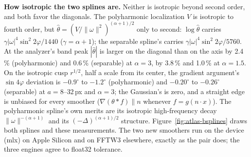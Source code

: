\documentclass[10pt]{article}
\begin{document}
\textbf{How isotropic the two splines are.} Neither is isotropic beyond second order, and both favor
the diagonals. The polyharmonic localization $V$ is isotropic to fourth order, but
$\hat\theta=(V/\|\omega\|^2)^{(\alpha+1)/2}$ only to second: $\log\hat\theta$ carries
$\gamma|\omega|^4\sin^2 2\varphi/1440$ ($\gamma=\alpha+1$); the separable spline's carries
$\gamma|\omega|^4\sin^2 2\varphi/5760$. At the analyzer's band peak $|\hat\theta|$ is larger on the
diagonal than on the axis by 2.4\,\% (polyharmonic) and 0.6\,\% (separable) at $\alpha=3$, by 3.8\,\%
and 1.0\,\% at $\alpha=1.5$. On the isotropic cusp $r^{1/2}$, half a scale from its center, the
gradient argument's $\sin4\varphi$ deviation is $-0.9^\circ$ to $-1.2^\circ$ (polyharmonic) and
$-0.20^\circ$ to $-0.26^\circ$ (separable) at $a=8$--$32$\,px and $\alpha=3$; the Gaussian's is
zero, and a straight edge is unbiased for every smoother ($\nabla(\theta*f)\parallel n$ whenever
$f=g(n\cdot x)$). The polyharmonic spline's own merits are its isotropic high-frequency decay
$\|\omega\|^{-(\alpha+1)}$ and its $(-\Delta)^{(\alpha+1)/2}$ structure. Figure~\ref{fig:atlas-bsplines}
draws both splines and these measurements. The two new smoothers run on the device (mlx) on Apple Silicon and on FFTW3 elsewhere,
exactly as the pair does; the three engines agree to float32 tolerance.
\end{document}

